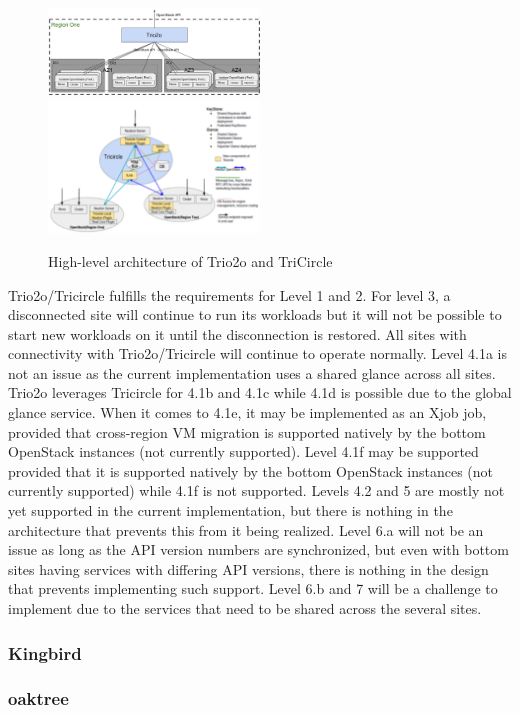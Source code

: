 \begin{figure}[htbp]
\begin{center}
\includegraphics[width=0.5\textwidth]{trio2oarch}
\includegraphics[width=0.5\textwidth]{tricirclearch}
\caption{High-level architecture of Trio2o \cite{Trio2oDesign} and TriCircle \cite{TriCircleDesign} }
\label{fig:Trio2oArch}
\end{center}
\end{figure}

Trio2o/Tricircle fulfills the requirements for Level 1 and 2. For level 3, a disconnected site will continue to run its workloads but it will not be possible to start new workloads on it until the disconnection is restored. All sites with connectivity with Trio2o/Tricircle will continue to operate normally. Level 4.1a is not an issue as the current implementation uses a shared glance across all sites. Trio2o leverages Tricircle for 4.1b and 4.1c while 4.1d is possible due to the global glance service. When it comes to 4.1e, it may be implemented as an Xjob job, provided that cross-region VM migration is supported natively by the bottom OpenStack instances (not currently supported). Level 4.1f may be supported provided that it is supported natively by the bottom OpenStack instances (not currently supported) while 4.1f is not supported. Levels 4.2  and 5 are mostly not yet supported in the current implementation, but there is nothing in the architecture that prevents this from it being realized. Level 6.a will not be an issue as long as the API version numbers are synchronized, but even with bottom sites having services with differing API versions, there is nothing in the design that prevents implementing such support. Level 6.b and 7 will be a challenge to implement due to the services that need to be shared across the several sites.  
\subsubsection{Kingbird}
\subsubsection{oaktree}

